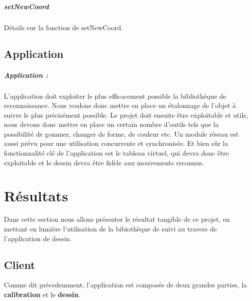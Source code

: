 \documentclass{report}
\begin{document}
						\paragraph{setNewCoord} \paragraph{}
						Détails sur la fonction de setNewCoord.
						
		\section{Application}
	\paragraph{Application :\\}
L'application doit exploiter le plus efficacement possible la bibliothèque de reconnaissance. Nous voulons donc mettre en place un étalonnage de l'objet à suivre le plus précisément possible. Le projet doit ensuite être exploitable et utile, nous devons donc mettre en place un certain nombre d'outils tels que la possibilité de gommer, changer de forme, de couleur etc. 
Un module réseau est aussi prévu pour une utilisation concurrente et synchronisée. Et bien sûr la fonctionnalité clé de l'application est le tableau virtuel, qui devra donc être exploitable et le dessin devra être fidèle aux mouvements reconnus.
	\chapter{Résultats}
		Dans cette section nous allons présenter le résultat tangible de ce projet, en mettant en lumière l'utilisation de la bibiothèque de suivi au travers de l'application de dessin.
		\section{Client}
			Comme dit précedemment, l'application est composée de deux grandes parties, la \textbf{calibration} et le \textbf{dessin}.
\end{document}
